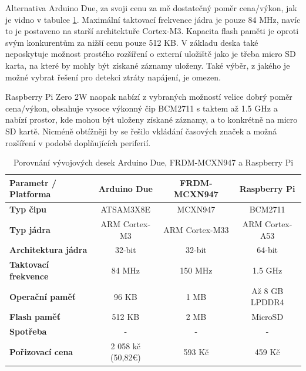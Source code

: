 Alternativa Arduino Due, za svoji cenu za mě dostatečný poměr cena/výkon, jak je vidno v tabulce \ref{tab:board-comparison}. Maximální taktovací frekvence jádra je pouze 84 MHz, navíc to je postaveno na starší architektuře Cortex-M3. Kapacita flash paměti je oproti svým konkurentům za nižší cenu pouze 512 KB. V základu deska také neposkytuje možnost prostého rozšíření o externí uložiště jako je třeba micro SD karta, na které by mohly být získané záznamy uloženy. Také výběr, z jakého je možné vybrat řešení pro detekci ztráty napájení, je omezen.

Raspberry Pi Zero 2W naopak nabízí z vybraných možností velice dobrý poměr cena/výkon, obsahuje vysoce výkonný čip BCM2711 s taktem až 1.5 GHz a nabízí prostor, kde mohou být uloženy získané záznamy, a to konkrétně na micro SD kartě. Nicméně obtížněji by se řešilo vkládání časových značek a možná rozšíření v podobě doplňujících periferií.

\begin{table}[h]
    \centering
    \renewcommand{\arraystretch}{1.2}
    \begin{adjustbox}{max width=\textwidth} %
    \begin{tabular}{|l|c|c|c|}
        \hline
        \textbf{Parametr / Platforma}   & \textbf{Arduino Due}  & \textbf{FRDM-MCXN947} & \textbf{Raspberry Pi} \\ 
        \hline
        \textbf{Typ čipu}               & ATSAM3X8E             & MCXN947               & BCM2711               \\ 
        \hline
        \textbf{Typ jádra}              & ARM Cortex-M3         & ARM Cortex-M33        & ARM Cortex-A53        \\ 
        \hline
        \textbf{Architektura jádra}     & 32-bit                & 32-bit                & 64-bit                \\ 
        \hline
        \textbf{Taktovací frekvence}    & 84 MHz                & 150 MHz               & 1.5 GHz               \\ 
        \hline
        \textbf{Operační paměť}         & 96 KB                 & 1 MB                  & Až 8 GB LPDDR4        \\ 
        \hline
        \textbf{Flash paměť}            & 512 KB                & 2 MB                  & MicroSD               \\ 
        \hline
        \textbf{Spotřeba }              & -                     & -                     & -                     \\ 
        \hline
        \textbf{Pořizovací cena}        & 2 058 kč (50,82€)                    & 593 Kč                & 459 Kč  \\ 
        \hline
    \end{tabular}
    \end{adjustbox}
    \caption{Porovnání vývojových desek Arduino Due, FRDM-MCXN947 a Raspberry Pi}
    \label{tab:board-comparison}
\end{table}
